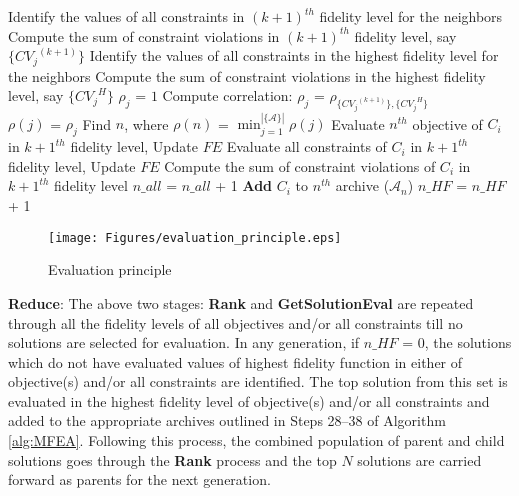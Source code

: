 \begin{minipage}[0.7\textheight]{0.95\columnwidth}
\begin{spacing}{0.7}
\begin{algorithm}[H]
\begin{algorithmic}[1]
				\ELSE
				\STATE Identify the values of all constraints in $(k+1)^{th}$ fidelity level for the neighbors
				\STATE Compute the sum of constraint violations in $(k+1)^{th}$ fidelity level, say $\{{CV_j}^{(k+1)}\}$
				\STATE Identify the values of all constraints in the highest fidelity level for the neighbors
				\STATE Compute the sum of constraint violations in the highest fidelity level, say $\{{CV_j}^H\}$
				\STATE $\rho_j$ = $1$
				\ELSE
				\STATE Compute correlation: $\rho_j$ = $\rho_{\{{CV_j}^{(k+1)}\},\{{CV_j}^H\}}$ \qquad {}\\
				\ENDIF
				\ENDIF
				\STATE $\rho (j)$ = $\rho_j$
				\ENDFOR
				\STATE Find $n$, where $\rho (n)$ = $\min_{j = 1}^{\left|\mathcal{\{A\}}\right|} \rho (j)$
				\STATE Evaluate $n^{th}$ objective of $C_i$ in ${k+1}^{th}$ fidelity level, Update $FE$
				\ELSE
				\STATE Evaluate all constraints of $C_i$ in ${k+1}^{th}$ fidelity level, Update $FE$
				\STATE Compute the sum of constraint violations of $C_i$ in ${k+1}^{th}$ fidelity level
				\ENDIF
				\STATE $n\_all$ = $n\_all$ + 1
				\STATE \textbf{Add} $C_i$ to $n^{th}$ archive ($\mathcal{A}_{n}$)
				\STATE $n\_HF$ = $n\_HF$ + 1
				\ENDIF
				\ENDIF
				\ENDFOR
			\end{algorithmic}
			\label{alg:getsolutioneval}
		\end{algorithm}
	\end{spacing}
\end{minipage}     

\begin{figure}[ht]
	\centering
	\texttt{[image: Figures/evaluation\_principle.eps]}
	\caption{Evaluation principle}
	\label{fig:evaluation_principle}
\end{figure}

\noindent\textbf{Reduce}: The above two stages: \textbf{Rank} and \textbf{GetSolutionEval} are repeated through all the fidelity levels of all objectives and/or all constraints till no solutions are selected for evaluation. In any generation, if $n\_HF$ = $0$, the solutions which do not have evaluated values of highest fidelity function in either of objective(s) and/or all constraints are identified. The top solution from this set is evaluated in the highest fidelity level of objective(s) and/or all constraints and added to the appropriate archives outlined in Steps 28--38 of Algorithm \ref{alg:MFEA}. Following this process, the combined population of parent and child solutions goes through the \textbf{Rank} process and the top $N$ solutions are carried forward as parents for the next generation.

